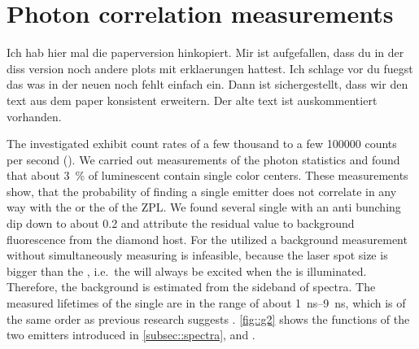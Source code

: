 	\section{Photon correlation measurements} \label{subsec::g2}

		\begin{remark}

			Ich hab hier mal die paperversion hinkopiert. Mir ist aufgefallen, dass du in der diss version noch andere plots mit erklaerungen hattest. Ich schlage vor du fuegst das was in der neuen noch fehlt einfach ein. Dann ist sichergestellt, dass wir den text aus dem paper konsistent erweitern. Der alte text ist auskommentiert vorhanden.

		\end{remark}

		The investigated \sivs exhibit count rates of a few thousand to a few \num{100000} counts per second (\SI{}{\cps}).
		We carried out measurements of the photon statistics and found that about \SI{3}{\percent} of luminescent \nds contain single color centers.
		These measurements show, that the probability of finding a single emitter does not correlate in any way with the \cwl or the \lw of the ZPL.
		We found several single \sivs with an anti bunching dip down to about \num{0.2} and attribute the residual \gtz value to background fluorescence from the diamond host.
		For the utilized \nds a background measurement without simultaneously measuring \siv \pl is infeasible, because the laser spot size is bigger than the \nd, i.e.\ the \siv will always be excited when the \nd is illuminated.
		Therefore, the background is estimated from the sideband of \siv spectra.
		The measured lifetimes of the single \sivs are in the range of about \SIrange{1}{9}{\ns}, which is of the same order as previous research suggests \cite{Sipahigil2014,Sternschulte1994}.
		\autoref{fig::g2} shows the \gt functions of the two emitters introduced in \autoref{subsec::spectra}, \emnarrow and \embroad.

